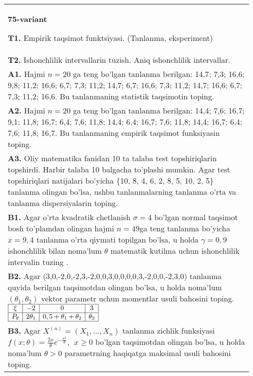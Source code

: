 \documentclass{article}
\begin{document}
\vspace{1cm}


\begin{tabular}{m{17cm}}
\textbf{75-variant}
\newline

\textbf{T1.} 
Empirik taqsimot funktsiyasi. (Tanlanma, eksperiment)
\\
\textbf{T2.} 
Ishonchlilik intervallarin tuzish. Aniq ishonchlilik intervallar.
\\
\textbf{A1.} 
Hajmi \(n = 20\) ga teng bo'lgan tanlanma berilgan: 14,7; 7,3; 16,6; 9,8; 11,2; 16,6; 6,7; 7,3; 11,2; 14,7; 6,7; 16,6; 7,3; 11,2; 14,7; 16,6; 6,7; 7,3; 11,2; 16,6. Bu tanlanmaning statistik taqsimotin toping.
\\
\textbf{A2.} 
Hajmi \(n = 20\) ga teng bo'lgan tanlanma berilgan: 14,4; 7,6; 16,7; 9,1; 11,8; 16,7; 6,4; 7,6; 11,8; 14,4; 6,4; 16,7; 7,6; 11,8; 14,4; 16,7; 6,4; 7,6; 11,8; 16,7. Bu tanlanmaning empirik taqsimot funksiyasin toping.
\\
\textbf{A3.} 
Oliy matematika fanidan 10 ta talaba test topshiriqlarin topshirdi. Harbir talaba 10 balgacha to'plashi mumkin. Agar test topshiriqlari natijalari bo'yicha \{10, 8, 4, 6, 2, 8, 5, 10, 2, 5\} tanlanma olingan bo'lsa, ushbu tanlanmalarning tanlanma o'rta va tanlanma dispersiyalarin toping.
\\
\textbf{B1.} 
Agar o'rta kvadratik chetlanish \(\sigma = 4\) bo'lgan normal taqsimot bosh to'plamdan olingan hajmi \(n = 49\)ga teng tanlanma bo'yicha \(\overline{x} = 9,4\) tanlanma o'rta qiymati topilgan bo'lsa, u holda \(\gamma = 0,9\) ishonchlilik bilan noma'lum \(\theta\) matematik kutilma uchun ishonchlilik intervalin tuzing .
\\
\textbf{B2.} 
Agar (3,0,-2,0,-2,3,-2,0,0,3,0,0,0,0,3,-2,0,0,-2,3,0) tanlanma quyida berilgan taqsimotdan olingan bo'lsa, u holda noma'lum \(\left( \theta_{1},\theta_{2} \right)\) vektor parametr uchun momentlar usuli bahosini toping.
$\begin{array}{|c|c|c|c|}
    \hline
    \xi & - 2 & 0 & 3 \\
    \hline
    P_{\theta} & 2\theta_{1} & 0,5 + \theta_{1} + \theta_{2} & \theta_{2} \\
    \hline
\end{array}$
\\
\textbf{B3.} 
Agar \(X^{(n)} = \left( X_{1},...,X_{n} \right)\) tanlanma zichlik funksiyasi \(f(x;\theta) = \frac{2x}{\theta}e^{- \frac{x^{2}}{\theta}},\ \ x \geq 0\) bo'lgan taqsimotdan olingan bo'lsa, u holda noma'lum \(\theta > 0\) parametrning haqiqatga maksimal usuli bahosini toping.

\end{tabular}
\end{document}
